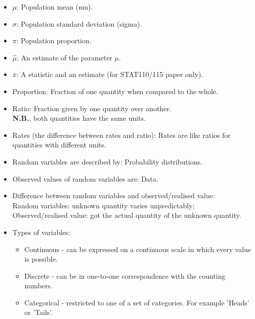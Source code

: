 \documentclass[12pt]{book}
\begin{document}


\begin{center}
	\ccbyncsa
\end{center}

\newpage
\thispagestyle{empty}
\mbox{}
\newpage

\setcounter{page}{1}

\pagestyle{fancy}

\begin{itemize}
\item $\mu$: Population mean (mu).
\item $\sigma$: Population standard deviation (sigma).
\item $\pi$: Population proportion.
\item $\hat{\mu}$: An estimate of the parameter $\mu$.
\item $\bar{x}$: A statistic and an estimate (for STAT110/115 paper only).
\item Proportion: Fraction of one quantity when compared to the whole.
\item Ratio: Fraction given by one quantity over another. \\
\textbf{N.B.}, both quantities have the same units.
\item Rates (the difference between rates and ratio): Rates are like ratios for quantities with different units.
\item Random variables are described by: Probability distributions.
\item Observed values of random variables are: Data.
\item Difference between random variables and observed/realised value: \\
Random variables: unknown quantity varies unpredictably; \\
Observed/realised value: got the actual quantity of the unknown quantity.
\item Types of variables: 
\begin{itemize}
\item Continuous - can be expressed on a continuous scale in which every value is possible.
\item Discrete - can be in one-to-one correspondence with the counting numbers.
\item Categorical - restricted to one of a set of categories. For example 'Heads' or 'Tails'.

\end{itemize}
\end{itemize}
\end{document}
